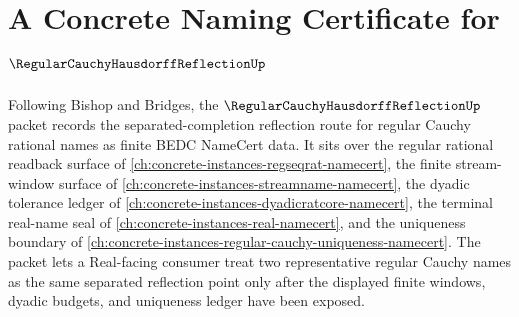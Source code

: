 \chapter{A Concrete Naming Certificate for $\RegularCauchyHausdorffReflectionUp$}
\label{ch:concrete-instances-regular-cauchy-hausdorff-reflection-namecert}

Following Bishop and Bridges, the $\RegularCauchyHausdorffReflectionUp$ packet records the separated-completion reflection route for regular Cauchy rational names as finite BEDC NameCert data. It sits over the regular rational readback surface of \autoref{ch:concrete-instances-regseqrat-namecert}, the finite stream-window surface of \autoref{ch:concrete-instances-streamname-namecert}, the dyadic tolerance ledger of \autoref{ch:concrete-instances-dyadicratcore-namecert}, the terminal real-name seal of \autoref{ch:concrete-instances-real-namecert}, and the uniqueness boundary of \autoref{ch:concrete-instances-regular-cauchy-uniqueness-namecert}. The packet lets a Real-facing consumer treat two representative regular Cauchy names as the same separated reflection point only after the displayed finite windows, dyadic budgets, and uniqueness ledger have been exposed.

